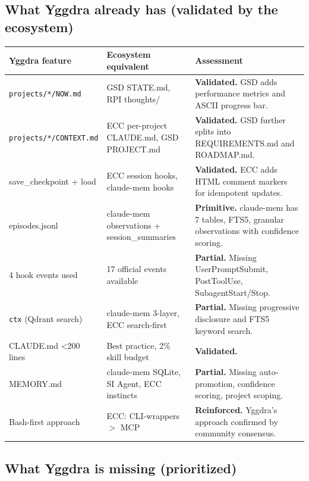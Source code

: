 \documentclass[11pt,a4paper]{article}
\begin{document}
\subsection{What Yggdra already has (validated by the ecosystem)}

\begin{longtable}{p{3.5cm} p{4.5cm} p{5cm}}
\toprule
\textbf{Yggdra feature} & \textbf{Ecosystem equivalent} & \textbf{Assessment} \\
\midrule
\endhead
\texttt{projects/*/NOW.md} & GSD STATE.md, RPI thoughts/ & \textbf{Validated.} GSD adds performance metrics and ASCII progress bar. \\
\midrule
\texttt{projects/*/CONTEXT.md} & ECC per-project CLAUDE.md, GSD PROJECT.md & \textbf{Validated.} GSD further splits into REQUIREMENTS.md and ROADMAP.md. \\
\midrule
save\_checkpoint + load & ECC session hooks, claude-mem hooks & \textbf{Validated.} ECC adds HTML comment markers for idempotent updates. \\
\midrule
episodes.jsonl & claude-mem observations + session\_summaries & \textbf{Primitive.} claude-mem has 7 tables, FTS5, granular observations with confidence scoring. \\
\midrule
4 hook events used & 17 official events available & \textbf{Partial.} Missing UserPromptSubmit, PostToolUse, SubagentStart/Stop. \\
\midrule
\texttt{ctx} (Qdrant search) & claude-mem 3-layer, ECC search-first & \textbf{Partial.} Missing progressive disclosure and FTS5 keyword search. \\
\midrule
CLAUDE.md <200 lines & Best practice, 2\% skill budget & \textbf{Validated.} \\
\midrule
MEMORY.md & claude-mem SQLite, SI Agent, ECC instincts & \textbf{Partial.} Missing auto-promotion, confidence scoring, project scoping. \\
\midrule
Bash-first approach & ECC: CLI-wrappers $>$ MCP & \textbf{Reinforced.} Yggdra's approach confirmed by community consensus. \\
\bottomrule
\end{longtable}

\subsection{What Yggdra is missing (prioritized)}
\end{document}
